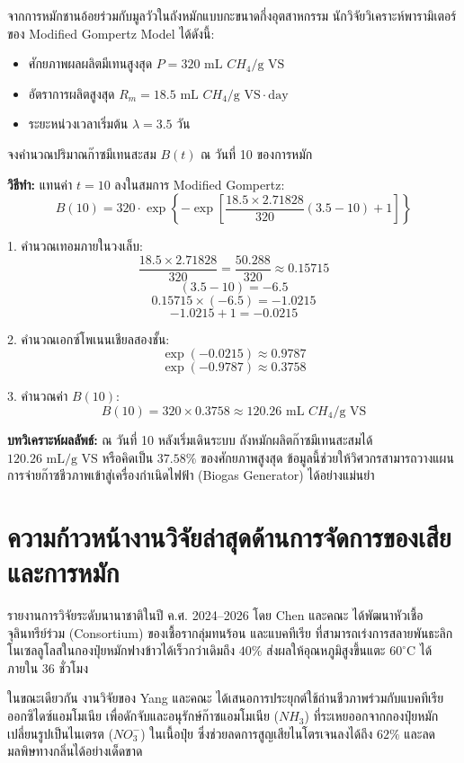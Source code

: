\begin{worked}
จากการหมักชานอ้อยร่วมกับมูลวัวในถังหมักแบบกะขนาดกึ่งอุตสาหกรรม นักวิจัยวิเคราะห์พารามิเตอร์ของ Modified Gompertz Model ได้ดังนี้:
\begin{itemize}
    \item ศักยภาพผลผลิตมีเทนสูงสุด $P = 320\text{ mL } CH_4/\text{g VS}$
    \item อัตราการผลิตสูงสุด $R_m = 18.5\text{ mL } CH_4/\text{g VS}\cdot\text{day}$
    \item ระยะหน่วงเวลาเริ่มต้น $\lambda = 3.5\text{ วัน}$
\end{itemize}
จงคำนวณปริมาณก๊าซมีเทนสะสม $B(t)$ ณ วันที่ 10 ของการหมัก

\textbf{วิธีทำ:}
แทนค่า $t = 10$ ลงในสมการ Modified Gompertz:
$$B(10) = 320 \cdot \exp\left\{ - \exp\left[ \frac{18.5 \times 2.71828}{320} (3.5 - 10) + 1 \right] \right\}$$

1. คำนวณเทอมภายในวงเล็บ:
$$\frac{18.5 \times 2.71828}{320} = \frac{50.288}{320} \approx 0.15715$$
$$(3.5 - 10) = -6.5$$
$$0.15715 \times (-6.5) = -1.0215$$
$$-1.0215 + 1 = -0.0215$$

2. คำนวณเอกซ์โพเนนเชียลสองชั้น:
$$\exp(-0.0215) \approx 0.9787$$
$$\exp(-0.9787) \approx 0.3758$$

3. คำนวณค่า $B(10)$:
$$B(10) = 320 \times 0.3758 \approx 120.26\text{ mL } CH_4/\text{g VS}$$

\textbf{บทวิเคราะห์ผลลัพธ์:} ณ วันที่ 10 หลังเริ่มเดินระบบ ถังหมักผลิตก๊าซมีเทนสะสมได้ $120.26\text{ mL/g VS}$ หรือคิดเป็น $37.58\%$ ของศักยภาพสูงสุด ข้อมูลนี้ช่วยให้วิศวกรสามารถวางแผนการจ่ายก๊าซชีวภาพเข้าสู่เครื่องกำเนิดไฟฟ้า (Biogas Generator) ได้อย่างแม่นยำ
\end{worked}

\section{ความก้าวหน้างานวิจัยล่าสุดด้านการจัดการของเสียและการหมัก}

รายงานการวิจัยระดับนานาชาติในปี ค.ศ. 2024–2026 โดย Chen และคณะ \cite{pmid37471462} ได้พัฒนาหัวเชื้อจุลินทรีย์ร่วม (Consortium) ของเชื้อรากลุ่มทนร้อน  และแบคทีเรีย  ที่สามารถเร่งการสลายพันธะลิกโนเซลลูโลสในกองปุ๋ยหมักฟางข้าวได้เร็วกว่าเดิมถึง $40\%$ ส่งผลให้อุณหภูมิสูงขึ้นแตะ $60^\circ\text{C}$ ได้ภายใน 36 ชั่วโมง

ในขณะเดียวกัน งานวิจัยของ Yang และคณะ \cite{pmid40131450} ได้เสนอการประยุกต์ใช้ถ่านชีวภาพร่วมกับแบคทีเรียออกซิไดซ์แอมโมเนีย เพื่อดักจับและอนุรักษ์ก๊าซแอมโมเนีย ($NH_3$) ที่ระเหยออกจากกองปุ๋ยหมัก เปลี่ยนรูปเป็นไนเตรต ($NO_3^-$) ในเนื้อปุ๋ย ซึ่งช่วยลดการสูญเสียไนโตรเจนลงได้ถึง $62\%$ และลดมลพิษทางกลิ่นได้อย่างเด็ดขาด

